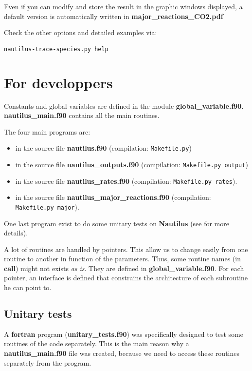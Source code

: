 \documentclass[english,a4paper,twoside]{article}
\begin{document}
Even if you can modify and store the result in the graphic windows displayed, a default version is automatically written in \textbf{major\_reactions\_CO2.pdf} 

Check the other options and detailed examples via:
\begin{verbatim}
nautilus-trace-species.py help
\end{verbatim}

\section{For developpers}\label{sec:advanced}
Constants and global variables are defined in the module \textbf{global\_variable.f90}. \textbf{nautilus\_main.f90} contains all the main routines. 

The four main programs are:
\begin{itemize}
\item {} in the source file \textbf{nautilus.f90} (compilation:  \verb|Makefile.py|)
\item {} in the source file \textbf{nautilus\_outputs.f90} (compilation: \verb|Makefile.py output|)
\item {} in the source file \textbf{nautilus\_rates.f90} (compilation: \verb|Makefile.py rates|).
\item {} in the source file \textbf{nautilus\_major\_reactions.f90} (compilation: \\ \verb|Makefile.py major|).
\end{itemize}

One last program exist to do some unitary tests on \textbf{Nautilus} (see  for more details).

A lot of routines are handled by pointers. This allow us to change easily from one routine to another in function of the parameters. Thus, some routine names (in \textbf{call}) might not exists \emph{as is}. They are defined in \textbf{global\_variable.f90}. For each pointer, an interface is defined that constrains the architecture of each subroutine he can point to. 

\subsection{Unitary tests}\label{sec:unitary_tests}
A \textbf{fortran} program  (\textbf{unitary\_tests.f90}) was specifically designed to test some routines of the code separately. This is the main reason why a \textbf{nautilus\_main.f90} file was created, because we need to access these routines separately from the  program.
\end{document}
